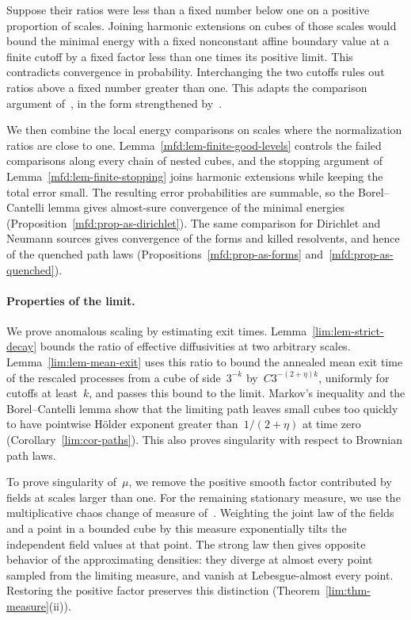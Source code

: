 \documentclass[11pt]{amsart}
\begin{document}
Suppose their ratios were less than a fixed number below one on a positive proportion of scales. Joining harmonic extensions on cubes of those scales would bound the minimal energy with a fixed nonconstant affine boundary value at a finite cutoff by a fixed factor less than one times its positive limit. This contradicts convergence in probability. Interchanging the two cutoffs rules out ratios above a fixed number greater than one. This adapts the comparison argument of~\citet{DGComparison}, in the form strengthened by~\citet*[Lemma~3.11]{Devlin2024}.

We then combine the local energy comparisons on scales where the normalization ratios are close to one. Lemma~\ref{mfd:lem-finite-good-levels} controls the failed comparisons along every chain of nested cubes, and the stopping argument of Lemma~\ref{mfd:lem-finite-stopping} joins harmonic extensions while keeping the total error small. The resulting error probabilities are summable, so the Borel--Cantelli lemma gives almost-sure convergence of the minimal energies (Proposition~\ref{mfd:prop-as-dirichlet}). The same comparison for Dirichlet and Neumann sources gives convergence of the forms and killed resolvents, and hence of the quenched path laws (Propositions~\ref{mfd:prop-as-forms} and~\ref{mfd:prop-as-quenched}).

\paragraph{Properties of the limit.}
We prove anomalous scaling by estimating exit times. Lemma~\ref{lim:lem-strict-decay} bounds the ratio of effective diffusivities at two arbitrary scales. Lemma~\ref{lim:lem-mean-exit} uses this ratio to bound the annealed mean exit time of the rescaled processes from a cube of side~$3^{-k}$ by~$C3^{-(2+\eta)k}$, uniformly for cutoffs at least~$k$, and passes this bound to the limit. Markov's inequality and the Borel--Cantelli lemma show that the limiting path leaves small cubes too quickly to have pointwise H\"older exponent greater than~$1/(2+\eta)$ at time zero (Corollary~\ref{lim:cor-paths}). This also proves singularity with respect to Brownian path laws.

To prove singularity of~$\mu$, we remove the positive smooth factor contributed by fields at scales larger than one. For the remaining stationary measure, we use the multiplicative chaos change of measure of~\citet[equation~(4.3)]{RVsurvey}. Weighting the joint law of the fields and a point in a bounded cube by this measure exponentially tilts the independent field values at that point. The strong law then gives opposite behavior of the approximating densities: they diverge at almost every point sampled from the limiting measure, and vanish at Lebesgue-almost every point. Restoring the positive factor preserves this distinction (Theorem~\ref{lim:thm-measure}(ii)).
\end{document}
